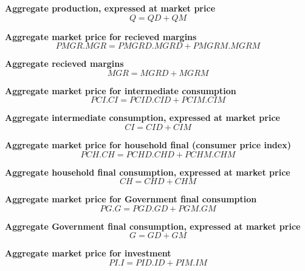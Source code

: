 \documentclass[12pt]{article}
\numberwithin{equation}{section}
\begin{document}
\noindent\textbf{Aggregate production, expressed at market price} \\
\begin{dmath}
Q = QD + QM
\end{dmath}

\noindent\textbf{Aggregate market price for recieved margins} \\
\begin{dmath}
PMGR . MGR = PMGRD . MGRD + PMGRM . MGRM
\end{dmath}

\noindent\textbf{Aggregate recieved margins} \\
\begin{dmath}
MGR = MGRD + MGRM
\end{dmath}

\noindent\textbf{Aggregate market price for intermediate consumption} \\
\begin{dmath}
PCI . CI = PCID . CID + PCIM . CIM
\end{dmath}

\noindent\textbf{Aggregate intermediate consumption, expressed at market price} \\
\begin{dmath}
CI = CID + CIM
\end{dmath}

\noindent\textbf{Aggregate market price for household final (consumer price index)} \\
\begin{dmath}
PCH . CH = PCHD . CHD + PCHM . CHM
\end{dmath}

\noindent\textbf{Aggregate household final consumption, expressed at market price} \\
\begin{dmath}
CH = CHD + CHM
\end{dmath}

\noindent\textbf{Aggregate market price for Government final consumption} \\
\begin{dmath}
PG . G = PGD . GD + PGM . GM
\end{dmath}

\noindent\textbf{Aggregate Government final consumption, expressed at market price} \\
\begin{dmath}
G = GD + GM
\end{dmath}

\noindent\textbf{Aggregate market price for investment} \\
\begin{dmath}
PI . I = PID . ID + PIM . IM
\end{dmath}
\end{document}
